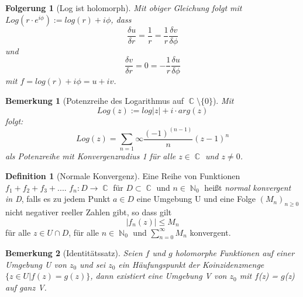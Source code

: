 \documentclass[10pt,a4paper]{article}
\theoremstyle{plain}
\newtheorem*{note}{Bemerkung}
\newtheorem*{folg}{Folgerung}
\theoremstyle{definition}
\newtheorem{defn}{Definition}[section]
\theoremstyle{remark}
\DeclareMathOperator{\C}{\mathbb{C}}
\DeclareMathOperator{\N}{\mathbb{N}}
\begin{document}
\begin{folg}[Log ist holomorph]

Mit obiger Gleichung folgt mit $Log(r\cdot e^{i \phi}) := log(r) + i \phi$, dass $$\frac{\delta u}{\delta r} =\frac{1}{r} = \frac{1}{r} \frac{\delta v}{\delta \phi} $$ und $$\frac{\delta v}{\delta r} = 0=-\frac{1}{r} \frac{\delta u}{\delta \phi}$$ mit $f = log(r) + i\phi= u +iv$.

\end{folg}

\begin{note}[Potenzreihe des Logarithmus auf $\C\setminus\{0\}$]

Mit $$Log(z) := log|z|+ i \cdot arg(z)$$ folgt: $$Log(z) = \sum_{n = 1}{\infty}\frac{(-1)^{(n-1)}}{n}(z-1)^{n}$$ als Potenzreihe mit Konvergenzradius 1 für alle $z \in \C$ und $z \neq 0$.

\end{note}

\begin{defn}[Normale Konvergenz]

Eine Reihe von Funktionen\\ $f_{1}+f_{2}+f_{3}+....$ $f_{n}: D\rightarrow \C $ für $D \subset \C$ und $n \in \N_{0}$ heißt \textit{normal konvergent in D}, falls es zu jedem Punkt $a \in D$ eine Umgebung U und eine Folge $(M_{n})_{n\geq0}$ nicht negativer reeller Zahlen gibt, so dass gilt $$|f_{n}(z)|\leq M_{n}$$ für alle $z \in U \cap D$, für alle $n \in \N_{0}$ und $\sum_{n = 0}^{\infty}M_{n}$ konvergent.

\end{defn}

\begin{note}[Identitätssatz]

Seien $f$ und $g$ holomorphe Funktionen auf einer Umgebung U von $z_{0}$ und sei $z_{0}$ ein Häufungspunkt der Koinzidenzmenge  $\{ z \in U  |  f(z) = g(z) \}$, dann existiert eine Umgebung V von $z_{0}$ mit $f$(z) = $g$(z) auf ganz V.

\end{note}
\end{document}
